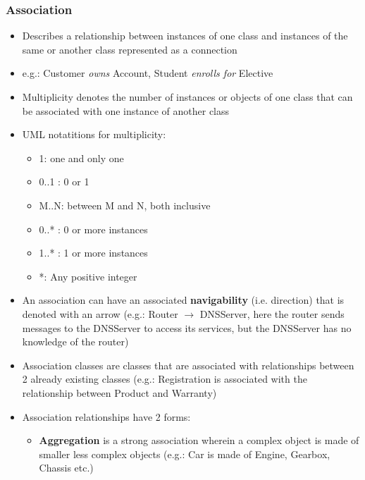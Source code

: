 \documentclass{article}
\begin{document}
\subsubsection{Association}
\begin{itemize}
    \item Describes a relationship between instances of one class and instances of the same or another class represented as a connection 
    
    \item e.g.: Customer \textit{owns} Account, Student \textit{enrolls for} Elective
    
    \item Multiplicity denotes the number of instances or objects of one class that can be associated with one instance of another class
    
    \item UML notatitions for multiplicity:
    \begin{itemize}
        \item 1: one and only one
        
        \item 0..1 : 0 or 1
        
        \item M..N: between M and N, both inclusive
        
        \item 0..* : 0 or more instances
        
        \item 1..* : 1 or more instances
        
        \item *: Any positive integer
    \end{itemize}
    
    \item An association can have an associated \textbf{navigability} (i.e. direction) that is denoted with an arrow (e.g.: Router $\rightarrow$ DNSServer, here the router sends messages to the DNSServer to access its services, but the DNSServer has no knowledge of the router)
    
    \item Association classes are classes that are associated with relationships between 2 already existing classes (e.g.: Registration is associated with the relationship between Product and Warranty)

    \item Association relationships have 2 forms:
    \begin{itemize}
        \item \textbf{Aggregation} is a strong association wherein a complex object is made of smaller less complex objects (e.g.: Car is made of Engine, Gearbox, Chassis etc.)
        

\end{itemize}
\end{itemize}
\end{document}
